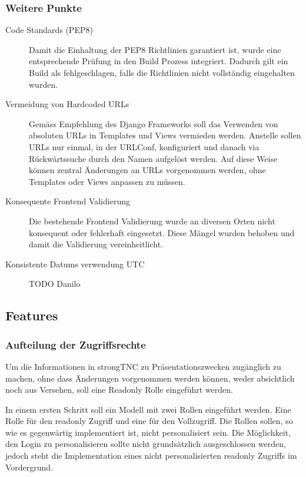 \subsubsection{Weitere Punkte}
\begin{description}
\item[Code Standards (PEP8)] Damit die Einhaltung der PEP8 Richtlinien
garantiert ist, wurde eine entsprechende Prüfung in den Build Prozess
integriert. Dadurch gilt ein Build als fehlgeschlagen, falls die Richtlinien
nicht vollständig eingehalten wurden.

\item[Vermeidung von Hardcoded URLs] Gemäss Empfehlung des Django Frameworks
soll das Verwenden von absoluten URLs in Templates und Views vermieden werden.
Anstelle sollen URLs nur einmal, in der URLConf, konfiguriert und danach via
Rückwärtssuche durch den Namen aufgelöst werden. Auf diese Weise können zentral
Änderungen an URLs vorgenommen werden, ohne Templates oder Views anpassen zu
müssen.

\item[Konsequente Frontend Validierung] Die bestehende Frontend Validierung
wurde an diversen Orten nicht konsequent oder fehlerhaft eingesetzt. Diese
Mängel wurden behoben und damit die Validierung vereinheitlicht.

\item[Konsistente Datums verwendung UTC]
TODO Danilo
\end{description}

\subsection{Features}

\subsubsection{Aufteilung der Zugriffsrechte}
Um die Informationen in strongTNC zu Präsentationszwecken zugänglich zu machen,
ohne dass Änderungen vorgenommen werden können, weder absichtlich noch aus
Versehen, soll eine Readonly Rolle eingeführt werden.

In einem ersten Schritt soll ein Modell mit zwei Rollen eingeführt werden. Eine
Rolle für den readonly Zugriff und eine für den Vollzugriff. Die Rollen sollen,
so wie es gegenwärtig implementiert ist, nicht personalisiert sein. Die
Möglichkeit, den Login zu personalisieren sollte nicht grundsätzlich
ausgeschlossen werden, jedoch steht die Implementation eines nicht
personalisierten readonly Zugriffs im Vordergrund.

